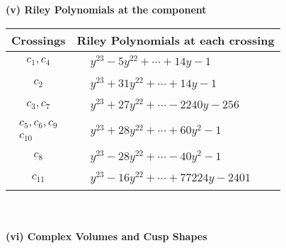\documentclass[1p]{elsarticle_modified}
\theoremstyle{definition}
\begin{document}
\newpage\renewcommand{\arraystretch}{1}
\flushleft \textbf{(v) Riley Polynomials at the component}\newline \\
\begin{tabular}{m{50pt}|m{274pt}}
Crossings & \hspace{64pt}Riley Polynomials at each crossing \\
\hline $$\begin{aligned}c_{1},c_{4}\end{aligned}$$&$\begin{aligned}
&y^{23}-5 y^{22}+\cdots+14 y-1
\end{aligned}$\\
\hline $$\begin{aligned}c_{2}\end{aligned}$$&$\begin{aligned}
&y^{23}+31 y^{22}+\cdots+14 y-1
\end{aligned}$\\
\hline $$\begin{aligned}c_{3},c_{7}\end{aligned}$$&$\begin{aligned}
&y^{23}+27 y^{22}+\cdots-2240 y-256
\end{aligned}$\\
\hline $$\begin{aligned}c_{5},c_{6},c_{9}\\c_{10}\end{aligned}$$&$\begin{aligned}
&y^{23}+28 y^{22}+\cdots+60 y^2-1
\end{aligned}$\\
\hline $$\begin{aligned}c_{8}\end{aligned}$$&$\begin{aligned}
&y^{23}-28 y^{22}+\cdots-40 y^2-1
\end{aligned}$\\
\hline $$\begin{aligned}c_{11}\end{aligned}$$&$\begin{aligned}
&y^{23}-16 y^{22}+\cdots+77224 y-2401
\end{aligned}$\\
\hline
\end{tabular}\\~\\
\newpage\flushleft \textbf{(vi) Complex Volumes and Cusp Shapes}
\end{document}

